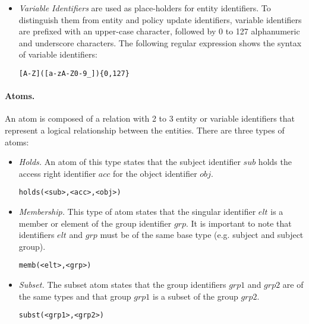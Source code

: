 \documentclass[glov2,twocolumn,final]{svjour2}
\newenvironment{vverbatim}
  {\begin{alltt}}
  {\vspace{-\baselineskip}\end{alltt}}
\begin{document}
\begin{itemize}
              \begin{vverbatim}
  [a-z]([a-zA-Z0-9\_])\{0,127\}
              \end{vverbatim}

            \item
              {\em Variable Identifiers} are used as place-holders for entity
              identifiers. To distinguish them from entity and policy update
              identifiers, variable identifiers are prefixed with an upper-case
              character, followed by 0 to 127 alphanumeric and underscore
              characters. The following regular expression shows the syntax of
              variable identifiers:

              \begin{vverbatim}
  [A-Z]([a-zA-Z0-9\_])\{0,127\}
              \end{vverbatim}
          \end{itemize}

        \paragraph{Atoms.}
          An atom is composed of a relation with 2 to 3 entity or variable
          identifiers that represent a logical relationship between the
          entities. There are three types of atoms:

          \begin{itemize}
            \item
              {\em Holds.} An atom of this type states that the subject
              identifier $sub$ holds the access right identifier $acc$
              for the object identifier $obj$.

              \begin{vverbatim}
  holds(<sub>, <acc>, <obj>)
              \end{vverbatim}
            \item
              {\em Membership.} This type of atom states that the singular
              identifier $elt$ is a member or element of the group identifier
              $grp$. It is important to note that identifiers $elt$ and $grp$
              must be of the same base type (e.g. subject and subject group).

              \begin{vverbatim}
  memb(<elt>, <grp>)
              \end{vverbatim}
            \item
              {\em Subset.} The subset atom states that the group identifiers
              $grp1$ and $grp2$ are of the same types and that group $grp1$ is
              a subset of the group $grp2$.

              \begin{vverbatim}
  subst(<grp1>, <grp2>)
              \end{vverbatim}
          \end{itemize}
\end{document}
